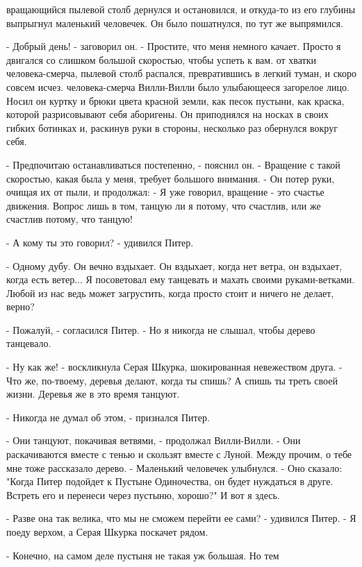 вращающийся пылевой столб дернулся и остановился, и откуда-то из его 
глубины выпрыгнул маленький человечек. Он было пошатнулся, по тут же 
выпрямился.
\par- Добрый день! - заговорил он. - Простите, что меня немного 
качает. Просто я двигался со слишком большой скоростью, чтобы успеть к 
вам.
 от хватки человека-смерча, пылевой столб распался, 
превратившись в легкий туман, и скоро совсем исчез.
 человека-смерча Вилли-Вилли было улыбающееся загорелое лицо. 
Носил он куртку и брюки цвета красной земли, как песок пустыни, как 
краска, которой разрисовывают себя аборигены. Он приподнялся на носках 
в своих гибких ботинках и, раскинув руки в стороны, несколько раз 
обернулся вокруг себя.
\par- Предпочитаю останавливаться постепенно, - пояснил он. - Вращение 
с такой скоростью, какая была у меня, требует большого внимания. - Он 
потер руки, очищая их от пыли, и продолжал: - Я уже говорил, вращение 
- это счастье движения. Вопрос лишь в том, танцую ли я потому, что 
счастлив, или же счастлив потому, что танцую!
\par- А кому ты это говорил? - удивился Питер.
\par- Одному дубу. Он вечно вздыхает. Он вздыхает, когда нет ветра, он 
вздыхает, когда есть ветер... Я посоветовал ему танцевать и махать 
своими руками-ветками. Любой из нас ведь может загрустить, когда 
просто стоит и ничего не делает, верно?
\par- Пожалуй, - согласился Питер. - Но я никогда не слышал, чтобы 
дерево танцевало.
\par- Ну как же! - воскликнула Серая Шкурка, шокированная невежеством 
друга. - Что же, по-твоему, деревья делают, когда ты спишь? А спишь ты 
треть своей жизни. Деревья же в это время танцуют.
\par- Никогда не думал об этом, - признался Питер.
\par- Они танцуют, покачивая ветвями, - продолжал Вилли-Вилли. - Они 
раскачиваются вместе с тенью и скользят вместе с Луной. Между прочим, 
о тебе мне тоже рассказало дерево. - Маленький человечек улыбнулся. - 
Оно сказало: "Когда Питер подойдет к Пустыне Одиночества, он будет 
нуждаться в друге. Встреть его и перенеси через пустыню, хорошо?" И 
вот я здесь.
\par- Разве она так велика, что мы не сможем перейти ее сами? - 
удивился Питер. - Я поеду верхом, а Серая Шкурка поскачет рядом.
\par- Конечно, на самом деле пустыня не такая уж большая. Но тем 
